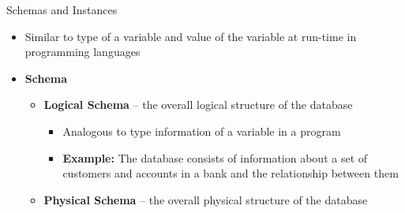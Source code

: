 \documentclass[aspectratio=169, xcolor=dvipsnames]{beamer}
\begin{document}
\begin{frame}{Schemas and Instances}
    \begin{itemize}[<+->]
        \item Similar to type of a variable and value of the variable at run-time in programming languages
        \item \textbf{Schema}
        \begin{itemize}
            \item \textbf{Logical Schema} -- the overall logical structure of the database
            \begin{itemize}
                \item[$\triangleright$] Analogous to type information of a variable in a program
                \item[$\triangleright$] \textbf{Example:} The database consists of information about a set of customers and accounts in a bank and the relationship between them
            \end{itemize}
            \item \textbf{Physical Schema} -- the overall physical structure of the database
        \end{itemize}
    \end{itemize}
    
\end{frame}
\end{document}
